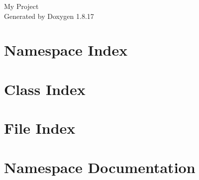 \let\mypdfximage\pdfximage\def\pdfximage{\immediate\mypdfximage}\documentclass[twoside]{book}
\newcommand{\+}{\discretionary{\mbox{\scriptsize$\hookleftarrow$}}{}{}}
\newcommand{\clearemptydoublepage}{%
  \newpage{\pagestyle{empty}\cleardoublepage}%
}
\begin{document}
\hypersetup{pageanchor=false,
             bookmarksnumbered=true,
             pdfencoding=unicode
            }
\begin{titlepage}
\vspace*{7cm}
\begin{center}%
{\Large My Project }\\
\vspace*{1cm}
{\large Generated by Doxygen 1.8.17}\\
\end{center}
\end{titlepage}
\clearemptydoublepage
{}
\tableofcontents
\clearemptydoublepage
{}
\hypersetup{pageanchor=true}

\chapter{Namespace Index}

\chapter{Class Index}

\chapter{File Index}

\chapter{Namespace Documentation}






















































\end{document}
